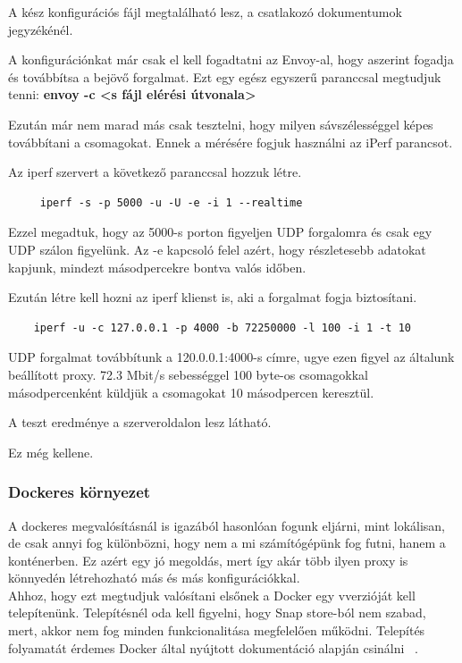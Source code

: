\documentclass[a4paper,oneside]{article}
\begin{document}
A kész konfigurációs fájl megtalálható lesz, a csatlakozó dokumentumok jegyzékénél.

A konfigurációnkat már csak el kell fogadtatni az Envoy-al, hogy aszerint
fogadja és továbbítsa a bejövő forgalmat. Ezt egy egész egyszerű paranccsal
megtudjuk tenni: \textbf{envoy -c <s fájl elérési útvonala>}

Ezután már nem marad más csak tesztelni, hogy milyen sávszélességgel képes
továbbítani a csomagokat. Ennek a mérésére fogjuk használni az iPerf parancsot.

Az iperf szervert a következő paranccsal hozzuk létre.
\begin{center}
  \begin {verbatim}
     iperf -s -p 5000 -u -U -e -i 1 --realtime
  \end{verbatim}
\end{center}
Ezzel megadtuk, hogy az 5000-s porton figyeljen UDP forgalomra és csak egy UDP
szálon figyelünk. Az -e kapcsoló felel azért, hogy részletesebb adatokat kapjunk,
mindezt másodpercekre bontva valós időben.

Ezután létre kell hozni az iperf klienst is, aki a forgalmat fogja biztosítani.
\begin{center}
  \begin{verbatim}
    iperf -u -c 127.0.0.1 -p 4000 -b 72250000 -l 100 -i 1 -t 10
  \end{verbatim}
\end{center}
UDP forgalmat továbbítunk a 120.0.0.1:4000-s címre, ugye ezen figyel az
általunk beállított proxy. 72.3 Mbit/s sebességgel 100 byte-os csomagokkal
másodpercenként küldjük a csomagokat 10 másodpercen keresztül.

A teszt eredménye a szerveroldalon lesz látható.

Ez még kellene.
\subsubsection{Dockeres környezet}
A dockeres megvalósításnál is igazából hasonlóan fogunk eljárni, mint lokálisan, de
csak annyi fog különbözni, hogy nem a mi számítógépünk fog futni, hanem a konténerben.
Ez azért egy jó megoldás, mert így akár több ilyen proxy is könnyedén létrehozható
más és más konfigurációkkal. \\

Ahhoz, hogy ezt megtudjuk valósítani elsőnek a Docker egy vverzióját kell
telepítenünk. Telepítésnél oda kell figyelni, hogy Snap store-ból nem szabad,
mert, akkor nem fog minden funkcionalitása megfelelően működni. Telepítés
folyamatát érdemes Docker által nyújtott dokumentáció alapján csinálni ~\cite{installdocker}.
\end{document}
